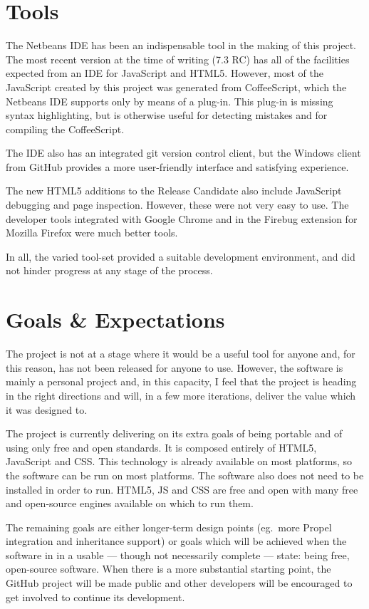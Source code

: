 \section{Tools}
The Netbeans IDE has been an indispensable tool in the making of this project. The most recent version at the time of writing (7.3 RC) has all of the facilities expected from an IDE for Java\-Script and HTML5. However, most of the Java\-Script created by this project was generated from Coffee\-Script, which the Netbeans IDE supports only by means of a plug-in. This plug-in is missing syntax highlighting, but is otherwise useful for detecting mistakes and for compiling the Coffee\-Script.

The IDE also has an integrated git version control client, but the Windows client from GitHub provides a more user-friendly interface and satisfying experience.

The new HTML5 additions to the Release Candidate also include Java\-Script debugging and page inspection. However, these were not very easy to use. The developer tools integrated with Google Chrome and in the Firebug extension for Mozilla Firefox were much better tools.

In all, the varied tool-set provided a suitable development environment, and did not hinder progress at any stage of the process.

\section{Goals \& Expectations}
The project is not at a stage where it would be a useful tool for anyone and, for this reason, has not been released for anyone to use. However, the software is mainly a personal project and, in this capacity, I feel that the project is heading in the right directions and will, in a few more iterations, deliver the value which it was designed to.

The project is currently delivering on its extra goals of being portable and of using only free and open standards. It is composed entirely of HTML5, Java\-Script and CSS. This technology is already available on most platforms, so the software can be run on most platforms. The software also does not need to be installed in order to run. HTML5, JS and CSS are free and open with many free and open-source engines available on which to run them.

The remaining goals are either longer-term design points (eg.\ more Propel integration and inheritance support) or goals which will be achieved when the software in in a usable --- though not necessarily complete --- state: being free, open-source software. When there is a more substantial starting point, the GitHub project will be made public and other developers will be encouraged to get involved to continue its development.


